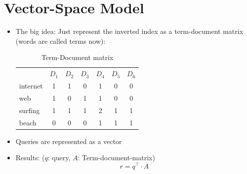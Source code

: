 \documentclass[a4paper]{scrartcl}
\begin{document}

\section{Vector-Space Model}
\label{sec:vector_space_model}
\begin{itemize}
\item The big idea: Just represent the inverted index as a term-document matrix
  (words are called terms now):
  \begin{table}[h!tbp]
    \centering
    \begin{tabular}{lcccccc}
      &$D_1$&$D_2$&$D_3$&$D_4$&$D_5$&$D_6$ \\
      internet & 1 & 1 & 0& 1 & 0 & 0 \\
      web & 1 & 0 & 1 & 1 & 0 & 0\\
      surfing & 1 & 1 & 1 & 2 & 1 & 1 \\
      beach & 0 & 0 & 0 & 1 & 1 & 1\\
    \end{tabular}
    \caption{Term-Document matrix}
    \label{tab:term_document_matrix}
  \end{table}
\item Queries are represented as a vector
\item Results: ($q$: query, $A$: Term-document-matrix)
  \begin{equation}
    \label{eq:vsm_result}
     r = q^\top \cdot A
  \end{equation}
\end{itemize}
\end{document}
